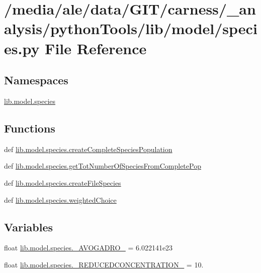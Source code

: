 \hypertarget{a00060}{\section{/media/ale/data/\-G\-I\-T/carness/\-\_\-analysis/python\-Tools/lib/model/species.py File Reference}
\label{a00060}
}
\subsection*{Namespaces}
\begin{DoxyCompactItemize}
\item 
\hyperlink{a00119}{lib.\-model.\-species}
\end{DoxyCompactItemize}
\subsection*{Functions}
\begin{DoxyCompactItemize}
\item 
def \hyperlink{a00119_aaa0ed83b7623b65c77b0d583590219ec}{lib.\-model.\-species.\-create\-Complete\-Species\-Population}
\item 
def \hyperlink{a00119_a1c482d162198854303fbcd154fb1ccbf}{lib.\-model.\-species.\-get\-Tot\-Number\-Of\-Species\-From\-Complete\-Pop}
\item 
def \hyperlink{a00119_a0aab4ec6c7d010b885204f0420072f29}{lib.\-model.\-species.\-create\-File\-Species}
\item 
def \hyperlink{a00119_a13eb7af04a51ec15dd79ef70fadc93f4}{lib.\-model.\-species.\-weighted\-Choice}
\end{DoxyCompactItemize}
\subsection*{Variables}
\begin{DoxyCompactItemize}
\item 
float \hyperlink{a00119_a4a6d118da79b62429ea35b64ef429b11}{lib.\-model.\-species.\-\_\-\-A\-V\-O\-G\-A\-D\-R\-O\-\_\-} = 6.\-022141e23
\item 
float \hyperlink{a00119_a29a5337ee23b2b7c99866ce2eb49380d}{lib.\-model.\-species.\-\_\-\-R\-E\-D\-U\-C\-E\-D\-C\-O\-N\-C\-E\-N\-T\-R\-A\-T\-I\-O\-N\-\_\-} = 10.
\end{DoxyCompactItemize}
